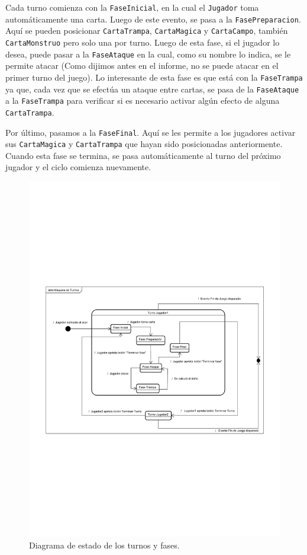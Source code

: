 	Cada turno comienza con la \texttt{FaseInicial}, en la cual el \texttt{Jugador} toma automáticamente una carta. Luego de este evento, se pasa a la \texttt{FasePreparacion}. Aquí se pueden posicionar \texttt{CartaTrampa}, \texttt{CartaMagica} y \texttt{CartaCampo}, también \texttt{CartaMonstruo} pero solo una por turno. Luego de esta fase, si el jugador lo desea, puede pasar a la \texttt{FaseAtaque} en la cual, como su nombre lo indica, se le permite atacar (Como dijimos antes en el informe, no se puede atacar en el primer turno del juego). Lo interesante de esta fase es que está  con la \texttt{FaseTrampa} ya que, cada vez que se efectúa un ataque entre cartas, se pasa de la \texttt{FaseAtaque} a la \texttt{FaseTrampa} para verificar si es necesario activar algún efecto de alguna \texttt{CartaTrampa}.
	
	Por último, pasamos a la \texttt{FaseFinal}. Aquí se les permite a los jugadores activar sus \texttt{CartaMagica} y \texttt{CartaTrampa} que hayan sido posicionadas anteriormente. Cuando esta fase se termina, se pasa automáticamente al turno del próximo jugador y el ciclo comienza nuevamente.
	
	
	
	\begin{figure}[H]
		\centering
		\includegraphics[scale=0.9]{includes/estado_Maquina_de_Turnos}
		\caption{Diagrama de estado de los turnos y fases.}
		\label{estado_Maquina_de_Turnos}
	\end{figure}
	
